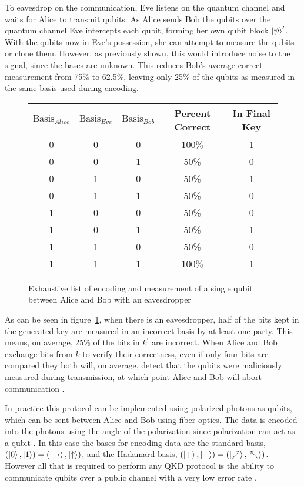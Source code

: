 To eavesdrop on the communication, Eve listens on the quantum channel and waits for Alice to transmit qubits.
As Alice sends Bob the qubits over the quantum channel Eve intercepts each qubit, forming her own qubit block $\ket{\psi}^\prime$.
With the qubits now in Eve's possession, she can attempt to measure the qubits or clone them.
However, as previously shown, this would introduce noise to the signal, since the bases are unknown.
This reduces Bob's average correct measurement from 75\% to 62.5\%, leaving only 25\% of the qubits as measured in the same basis used during encoding.
\begin{figure}[htp]
	\centering
	\begin{tabular}{|c|c|c|c|c|}
		\hline
		$\textrm{Basis}_{Alice}$ & $\textrm{Basis}_{Eve}$ &$\textrm{Basis}_{Bob}$ & Percent Correct & In Final Key\\ \hline
    	0 & 0 & 0 & 100\% & 1 \\ \hline		
    	0 & 0 & 1 &  50\% & 0 \\ \hline		
    	0 & 1 & 0 &  50\% & 1 \\ \hline		
    	0 & 1 & 1 &  50\% & 0 \\ \hline		
    	1 & 0 & 0 &  50\% & 0 \\ \hline		
    	1 & 0 & 1 &  50\% & 1 \\ \hline		
    	1 & 1 & 0 &  50\% & 0 \\ \hline		
    	1 & 1 & 1 & 100\% & 1 \\ \hline		
	\end{tabular}
	\caption{Exhaustive list of encoding and measurement of a single qubit between Alice and Bob with an eavesdropper}
	\label{fig:possible_measurements_eve}
\end{figure}
As can be seen in figure~\ref{fig:possible_measurements_eve}, when there is an eavesdropper, half of the bits kept in the generated key are measured in an incorrect basis by at least one party.
This means, on average, 25\% of the bits in $k^\prime$ are incorrect.
When Alice and Bob exchange bits from $k$ to verify their correctness, even if only four bits are compared they both will, on average, detect that the qubits were maliciously measured during transmission, at which point Alice and Bob will abort communication \cite{MikeAndIke}. 

In practice this protocol can be implemented using polarized photons as qubits, which can be sent between Alice and Bob using fiber optics.
The data is encoded into the photons using the angle of the polarization since polarization can act as a qubit \cite{qc:agi}.
In this case the bases for encoding data are the standard basis, $(\ket{0}, \ket{1}) = (\ket{\rightarrow}, \ket{\uparrow})$, and the Hadamard basis, $(\ket{+}, \ket{-}) = (\ket{\nearrow}, \ket{\nwarrow})$.
However all that is required to perform any QKD protocol is the ability to communicate qubits over a public channel with a very low error rate \cite{MikeAndIke}.